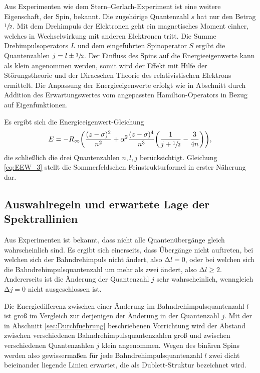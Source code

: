 Aus Experimenten wie dem Stern--Gerlach-Experiment ist eine weitere Eigenschaft, der Spin, bekannt.
Die zugehörige Quantenzahl $s$ hat nur den Betrag $\sfrac{1}{2}$.
Mit dem Drehimpuls der Elektronen geht ein magnetisches Moment einher, welches in Wechselwirkung mit anderen Elektronen tritt.
Die Summe %
Drehimpulsoperators $L$ und dem eingeführten Spinoperator $S$ ergibt die Quantenzahlen
$j=l\pm\sfrac{1}{2}$.
Der Einfluss des Spins auf die Energieeigenwerte kann als klein angenommen werden, somit wird der Effekt mit Hilfe der Störungstheorie und der Diracschen Theorie des relativistischen Elektrons ermittelt.
Die Anpassung der Energieeigenwerte erfolgt wie in Abschnitt \label{sub:rel} durch Addition des Erwartungswertes vom angepassten Hamilton-Operators in Bezug auf Eigenfunktionen.

Es ergibt sich die Energieeigenwert-Gleichung
\begin{equation}
	E=-R_\infty\biggl(\frac{(z-\sigma)^2}{n^2}+\alpha^2\frac{(z-\sigma)^4}{n^3}\biggl(\frac{1}{j+\sfrac{1}{2}}-\frac{3}{4n}\biggr) \biggr),
	\label{eq:EEW_3}
\end{equation}
die schließlich die drei Quantenzahlen $n,l,j$ berücksichtigt.
Gleichung \eqref{eq:EEW_3} stellt die Sommerfeldschen Feinstrukturformel in erster Näherung dar.

\subsection{Auswahlregeln und erwartete Lage der Spektrallinien}
Aus Experimenten ist bekannt, dass nicht alle Quantenübergänge gleich wahrscheinlich sind.
Es ergibt sich einerseits, dass Übergänge nicht auftreten, bei welchen sich der Bahndrehimpuls nicht ändert, also $\mathup\Delta l=0$, oder bei welchen sich  die Bahndrehimpulsquantenzahl um mehr als zwei ändert, also $\mathup\Delta l\ge2$.
Andererseits ist die Änderung der Quantenzahl $j$ sehr wahrscheinlich, wenngleich $\mathup\Delta j=0$ nicht ausgeschlossen ist.

Die Energiedifferenz zwischen einer Änderung im Bahndrehimpulsquantenzahl $l$ ist groß im Vergleich zur derjenigen der Änderung in der Quantenzahl $j$.
Mit der in Abschnitt \ref{sec:Durchfuehrung} beschriebenen Vorrichtung wird der Abstand zwischen verschiedenen Bahndrehimpulsquantenzahlen groß und zwischen verschiedenen Quantenzahlen $j$ klein angenommen.
Wegen des binären Spins werden also gewissermaßen für jede Bahndrehimpulsquantenzahl $l$ zwei dicht beieinander liegende Linien erwartet, die als Dublett-Struktur bezeichnet wird.

